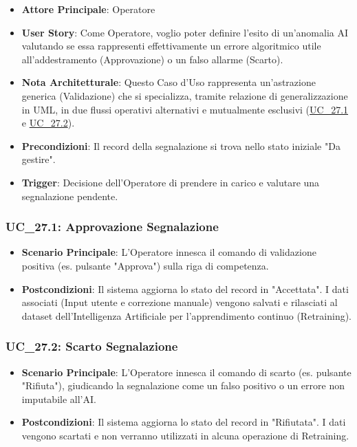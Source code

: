 \begin{itemize}
    \item \textbf{Attore Principale}: Operatore
    \item \textbf{User Story}: Come Operatore, voglio poter definire l'esito di un'anomalia AI valutando se essa rappresenti effettivamente un errore algoritmico utile all'addestramento (Approvazione) o un falso allarme (Scarto).
    \item \textbf{Nota Architetturale}: Questo Caso d'Uso rappresenta un'astrazione generica (Validazione) che si specializza, tramite relazione di generalizzazione in UML, in due flussi operativi alternativi e mutualmente esclusivi (\hyperref[uc_27.1]{UC\_27.1} e \hyperref[uc_27.2]{UC\_27.2}).
    \item \textbf{Precondizioni}: Il record della segnalazione si trova nello stato iniziale "Da gestire".
    \item \textbf{Trigger}: Decisione dell'Operatore di prendere in carico e valutare una segnalazione pendente.
\end{itemize}

\subsubsection{UC\_27.1: Approvazione Segnalazione}
\label{uc_27.1}
\begin{itemize}
    \item \textbf{Scenario Principale}: L'Operatore innesca il comando di validazione positiva (es. pulsante "Approva") sulla riga di competenza.
    \item \textbf{Postcondizioni}: Il sistema aggiorna lo stato del record in "Accettata". I dati associati (Input utente e correzione manuale) vengono salvati e rilasciati al dataset dell'Intelligenza Artificiale per l'apprendimento continuo (Retraining).
\end{itemize}

\subsubsection{UC\_27.2: Scarto Segnalazione}
\label{uc_27.2}
\begin{itemize}
    \item \textbf{Scenario Principale}: L'Operatore innesca il comando di scarto (es. pulsante "Rifiuta"), giudicando la segnalazione come un falso positivo o un errore non imputabile all'AI.
    \item \textbf{Postcondizioni}: Il sistema aggiorna lo stato del record in "Rifiutata". I dati vengono scartati e non verranno utilizzati in alcuna operazione di Retraining.
\end{itemize}

